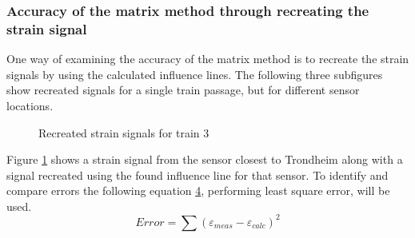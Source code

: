 \subsubsection{Accuracy of the matrix method through recreating the strain signal}
One way of examining the accuracy of the matrix method is to recreate the strain signals by using the calculated influence lines. The following three subfigures show recreated signals for a single train passage, but for different sensor locations.
\begin{figure}[H]
	\begin{subfigure}[t]{0.9\textwidth}
			
		\label{recreated_sensor_trond_train3}
	\end{subfigure}

	\begin{subfigure}[t]{0.9\textwidth}
			
		\label{recreated_sensor_middle_train3}
	\end{subfigure}

	\begin{subfigure}[t]{0.9\textwidth}
			
		\label{recreated_sensor_heimdal_train3}
	\end{subfigure}
	\caption{Recreated strain signals for train 3}
	\label{fig:recreated_strains}
\end{figure}
Figure \ref{recreated_sensor_trond_train3} shows a strain signal from the sensor closest to Trondheim along with a signal recreated using the found influence line for that sensor. To identify and compare errors the following equation \ref{fig:recreated_strains}, performing least square error, will be used.
\begin{equation}
	Error = \sum{ (\varepsilon_{meas} - \varepsilon_{calc})^2}
\end{equation}

